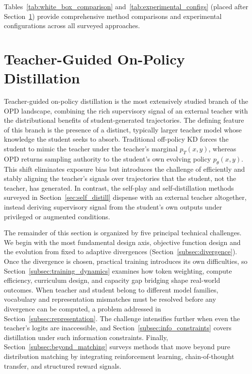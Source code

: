 \documentclass{article} %
\newcommand{\ptheta}{p_\theta}
\newcommand{\pteacher}{p_T}
\begin{document}
Tables~\ref{tab:white_box_comparison} and~\ref{tab:experimental_configs} (placed after Section~\ref{sec:teacher_guided}) provide comprehensive method comparisons and experimental configurations across all surveyed approaches.


\section{Teacher-Guided On-Policy Distillation}
\label{sec:teacher_guided}

Teacher-guided on-policy distillation is the most extensively studied branch of the OPD landscape, combining the rich supervisory signal of an external teacher with the distributional benefits of student-generated trajectories. The defining feature of this branch is the presence of a distinct, typically larger teacher model whose knowledge the student seeks to absorb. Traditional off-policy KD forces the student to mimic the teacher under the teacher's marginal $\pteacher(x,y)$, whereas OPD returns sampling authority to the student's own evolving policy $\ptheta(x,y)$. This shift eliminates exposure bias but introduces the challenge of efficiently and stably aligning the teacher's signals over trajectories that the student, not the teacher, has generated. In contrast, the self-play and self-distillation methods surveyed in Section~\ref{sec:self_distill} dispense with an external teacher altogether, instead deriving supervisory signal from the student's own outputs under privileged or augmented conditions.

The remainder of this section is organized by five principal technical challenges. We begin with the most fundamental design axis, objective function design and the evolution from fixed to adaptive divergences (Section~\ref{subsec:divergence}). Once the divergence is chosen, practical training introduces its own difficulties, so Section~\ref{subsec:training_dynamics} examines how token weighting, compute efficiency, curriculum design, and capacity gap bridging shape real-world outcomes. When teacher and student belong to different model families, vocabulary and representation mismatches must be resolved before any divergence can be computed, a problem addressed in Section~\ref{subsec:representation}. The challenge intensifies further when even the teacher's logits are inaccessible, and Section~\ref{subsec:info_constraints} covers distillation under such information constraints. Finally, Section~\ref{subsec:beyond_matching} surveys methods that move beyond pure distribution matching by integrating reinforcement learning, chain-of-thought transfer, and structured reward signals.
\end{document}
